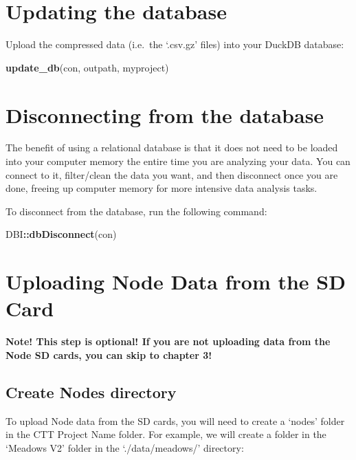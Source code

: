 \documentclass[
]{book}
\newenvironment{Shaded}{\begin{snugshade}}{\end{snugshade}}
\newcommand{\FunctionTok}[1]{\textcolor[rgb]{0.13,0.29,0.53}{\textbf{#1}}}
\newcommand{\NormalTok}[1]{#1}
\newcommand{\SpecialCharTok}[1]{\textcolor[rgb]{0.81,0.36,0.00}{\textbf{#1}}}
\begin{document}
\section{Updating the database}\label{updating-the-database}

Upload the compressed data (i.e.~the `.csv.gz' files) into your DuckDB database:

\begin{Shaded}
\begin{Highlighting}[]
\FunctionTok{update\_db}\NormalTok{(con, outpath, myproject)}
\end{Highlighting}
\end{Shaded}

\section{Disconnecting from the database}\label{disconnecting-from-the-database}

The benefit of using a relational database is that it does not need to be loaded into your computer memory the entire time you are analyzing your data. You can connect to it, filter/clean the data you want, and then disconnect once you are done, freeing up computer memory for more intensive data analysis tasks.

To disconnect from the database, run the following command:

\begin{Shaded}
\begin{Highlighting}[]
\NormalTok{DBI}\SpecialCharTok{::}\FunctionTok{dbDisconnect}\NormalTok{(con)}
\end{Highlighting}
\end{Shaded}

\section{Uploading Node Data from the SD Card}\label{uploading-node-data-from-the-sd-card}

\textbf{Note! This step is optional! If you are not uploading data from the Node SD cards, you can skip to chapter 3!}

\subsection{Create Nodes directory}\label{create-nodes-directory}

To upload Node data from the SD cards, you will need to create a `nodes' folder in the CTT Project Name folder. For example, we will create a folder in the `Meadows V2' folder in the `./data/meadows/' directory:
\end{document}
